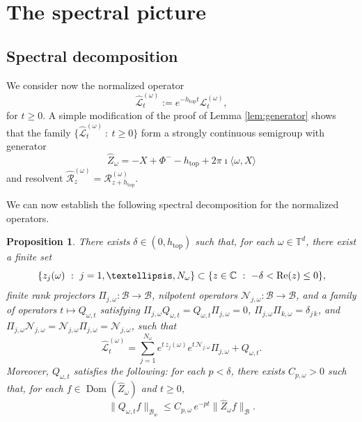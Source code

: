 \documentclass[11pt,letterpaper]{amsart}
\newcommand \cL {{\mathcal L}}
\newcommand \cR {{\mathcal R}}
\def\C{{\mathbb C}}
\newcommand \T {{ \mathbb T}}
\newcommand \cB {{\mathscr B}}
\newcommand \re {{%
\operatorname{Re}
}}
\DeclareMathOperator{\topp}{top}
\newtheorem {proposition}[theorem]{Proposition}
\theoremstyle{definition}
\begin{document}
\section{The spectral picture}\label{sec:spectral_picture}












\subsection{Spectral decomposition} 

We consider now the normalized operator
\[
\hat \cL_t^{(\omega)}:=e^{-h_{\topp}t}\cL_t^{(\omega)}, 
\]
for $t \ge 0$. A simple modification of the proof of Lemma \ref{lem:generator} shows that the family $\{\hat \cL_t^{(\omega)} \ : \ t \geq 0\}$ form a strongly continuous semigroup with generator
\[
\hat Z_\omega= -X+ \Phi^- -h_{\topp} + 2\pi \imath \langle \omega, X \rangle
\] 
and resolvent $\hat\cR^{(\omega)}_z=\cR^{(\omega)}_{z+h_{\topp}}$.

We can now establish the following spectral decomposition for the normalized operators.

 \begin{proposition}\label{prop:pert1}
 	There exists $\delta \in (0,h_{\topp})$ such that, for each $\omega \in \T^d$, there exist a finite set 
 	\[
 	\{z_j{(\omega)} \ :\ j=1, \dots,N_{\omega} \} \subset \{ z \in \C \ : \ -\delta < \re(z) \leq 0 \},
	\] 
	finite rank projectors $\Pi_{j,\omega}:\cB \to \cB$, nilpotent operators $\mathcal{N}_{j,\omega}:\cB \to \cB$, and a family of operators $t \mapsto Q_{\omega,t}$ satisfying $\Pi_{j,\omega} Q_{\omega,t}=Q_{\omega,t}\Pi_{j,\omega}=0$, $\Pi_{j,\omega}\Pi_{k,\omega} = \delta_{j \, k}$, and $\Pi_{j,\omega}\mathcal{N}_{j,\omega} = \mathcal{N}_{j,\omega} \Pi_{j,\omega}= \mathcal{N}_{j,\omega}$, such that
  \[
  \hat\cL^{(\omega)}_t= \sum_{j=1}^{N_{\omega}} e^{t \, z_j{(\omega)} } e^{t \, \mathcal{N}_{j,\omega}}\Pi_{j,\omega}+Q_{\omega,t}.
  \]
  Moreover, $Q_{\omega,t}$ satisfies the following: for each $p<\delta$, there exists $C_{p,\omega}>0$ such that, for each $f\in \operatorname{Dom}({\hat Z_{\omega}})$ and $t \ge 0$, 
\begin{equation}\label{eq:decay}
\|Q_{\omega, t}f\|_{\cB_w} \le C_{p,\omega} \, e^{-p t} \|{\hat Z_{\omega}} f\|_{\cB}.
\end{equation}
 \end{proposition}
\end{document}
